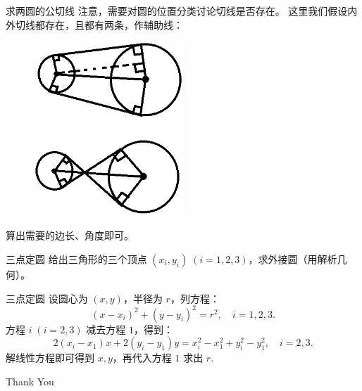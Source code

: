 \documentclass{beamer}
\begin{document}
\begin{frame}{求两圆的公切线}
    \small
    注意，需要对圆的位置分类讨论切线是否存在。
    这里我们假设内外切线都存在，且都有两条，作辅助线：
    \begin{figure}[H]
        \centering
        \includegraphics[width=0.5\textwidth]{pic/tangentTwoCircleFZ.png}
    \end{figure}

    算出需要的边长、角度即可。
\end{frame}

\begin{frame}{三点定圆}
    \small
    给出三角形的三个顶点 $(x_i,y_i)\;(i=1,2,3)$，求外接圆（用解析几何）。
\end{frame}

\begin{frame}{三点定圆}
    \small
    设圆心为 $(x,y)$，半径为 $r$，列方程：
    \begin{equation}
        (x-x_i)^2 + (y-y_i)^2 = r^2, \quad i=1,2,3.
    \end{equation}
    方程 $i\;(i=2,3)$ 减去方程 $1$，得到：
    \begin{equation}
        2(x_i-x_1)x + 2(y_i-y_1)y = x_i^2-x_1^2+y_i^2-y_1^2,\quad i=2,3.
    \end{equation}
    解线性方程即可得到 $x,y$，再代入方程 $1$ 求出 $r$.
\end{frame}

\begin{frame}
    \begin{center}
        {\Huge\calligra Thank You}
    \end{center}
\end{frame}
\end{document}
